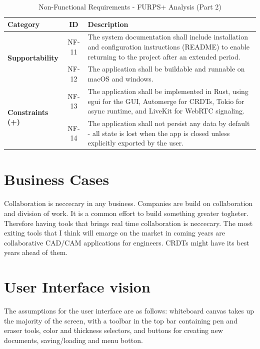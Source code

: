 \documentclass[a4paper,11pt,twoside]{report}
\theoremstyle{definition}
\begin{document}
\begin{table}[H]
	\centering
	\caption{Non-Functional Requirements - FURPS+ Analysis (Part 2)}
	\begin{tabular}{|p{}|c|p{}|}
		\hline
		\textbf{Category} & \textbf{ID} & \textbf{Description} \\
		\hline
		\multirow{2}{*}{\parbox{0.18\textwidth}{\textbf{Supportability}}}
		& NF-11 & The system documentation shall include installation and configuration instructions (README) to enable returning to the project after an extended period. \\
		\cline{2-3}
		& NF-12 & The application shall be buildable and runnable on macOS and windows. \\
		\hline
		\multirow{2}{*}{\parbox{0.18\textwidth}{\textbf{Constraints (+)}}}
		& NF-13 & The application shall be implemented in Rust, using egui for the GUI, Automerge for CRDTs, Tokio for async runtime, and LiveKit for WebRTC signaling. \\
		\cline{2-3}
		& NF-14 & The application shall not persist any data by default - all state is lost when the app is closed unless explicitly exported by the user. \\
		\hline
	\end{tabular}
	\label{tab:furps-analysis-2}
\end{table}


\section{Business Cases}

Collaboration is neccecary in any business. Companies are build on collaboration and division of work. 
It is a common effort to build something greater togheter. Therefore having tools that brings real time 
collaboration is neccecary.  The most exiting tools that I think will emarge on the market in coming years 
are collaborative CAD/CAM applications for engineers. CRDTs might have its best years ahead of them. 


\section{User Interface vision}

The assumptions for the user interface are as follows: whiteboard canvas takes up the majority of the screen, with a 
toolbar in the top bar  containing pen and eraser tools, color and thickness selectors, and buttons for 
creating new documents, saving/loading and menu botton.
\end{document}
